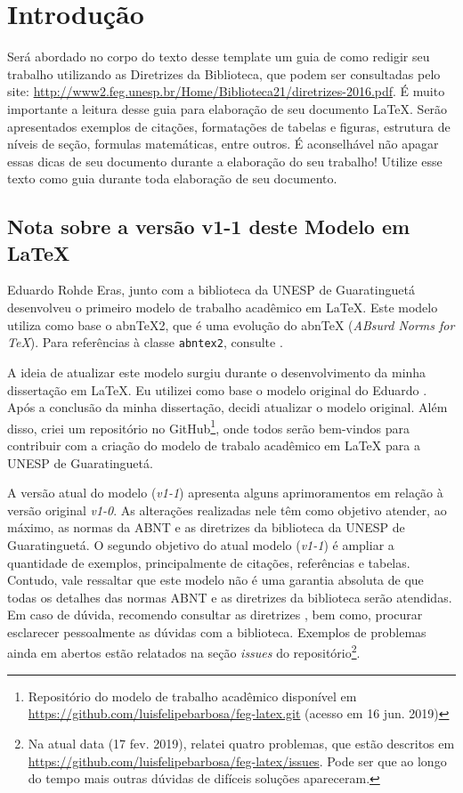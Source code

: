 \documentclass[
  12pt,		%
  a4paper,	%
  openright,%
  oneside,	%
  chapter=TITLE,		%
  section=TITLE,		%
  english,	%
  french,	%
  spanish,	%
  brazil
]{abntex2}
\begin{document}
    \chapter{Introdução}
    
    Será abordado no corpo do texto desse template um guia de como redigir seu trabalho utilizando as Diretrizes da Biblioteca, que podem ser consultadas pelo site: \url{http://www2.feg.unesp.br/Home/Biblioteca21/diretrizes-2016.pdf}. É muito importante a leitura desse guia para elaboração de seu documento \LaTeX. Serão apresentados exemplos de citações, formatações de tabelas e figuras, estrutura de níveis de seção, formulas matemáticas, entre outros. É aconselhável não apagar essas dicas de seu documento durante a elaboração do seu trabalho! Utilize esse texto como guia durante toda elaboração de seu documento.
    
    \section{Nota sobre a versão v1-1 deste Modelo em \LaTeX}
    
    Eduardo Rohde Eras, junto com a biblioteca da UNESP de Guaratinguetá desenvolveu o primeiro modelo de trabalho acadêmico em \LaTeX. Este modelo utiliza como base o abn\TeX{}2, que é uma evolução do abn\TeX{} (\textit{ABsurd Norms for \TeX}). Para referências à classe \verb|abntex2|, consulte .
    
    A ideia de atualizar este modelo surgiu durante o desenvolvimento da minha dissertação em \LaTeX. Eu utilizei como base o modelo original do Eduardo \cite{modeloLatex2017}. Após a conclusão da minha dissertação, decidi atualizar o modelo original. Além disso, criei um repositório no GitHub\footnote{Repositório do modelo de trabalho acadêmico disponível em \url{https://github.com/luisfelipebarbosa/feg-latex.git} (acesso em 16 jun. 2019)}, onde todos serão bem-vindos para contribuir com a criação do modelo de trabalo acadêmico em \LaTeX{} para a UNESP de Guaratinguetá.
    
    A versão atual do modelo (\emph{v1-1}) apresenta alguns aprimoramentos em relação à versão original \emph{v1-0}. As alterações realizadas nele têm como objetivo atender, ao máximo, as normas da ABNT e as diretrizes da biblioteca da UNESP de Guaratinguetá. O segundo objetivo do atual modelo (\emph{v1-1}) é ampliar a quantidade de exemplos, principalmente de citações, referências e tabelas.  Contudo, vale ressaltar que este modelo não é uma garantia absoluta de que todas os detalhes das normas ABNT e as diretrizes da biblioteca  serão atendidas. Em caso de dúvida, recomendo consultar as diretrizes \cite{diretrizes2016}, bem como, procurar esclarecer pessoalmente as dúvidas com a biblioteca. Exemplos de problemas ainda em abertos estão relatados na seção \textit{issues} do repositório\footnote{Na atual data (17 fev. 2019), relatei quatro problemas, que estão descritos em \url{https://github.com/luisfelipebarbosa/feg-latex/issues}. Pode ser que ao longo do tempo mais outras dúvidas de difíceis soluções apareceram.}.    
    
\end{document}
